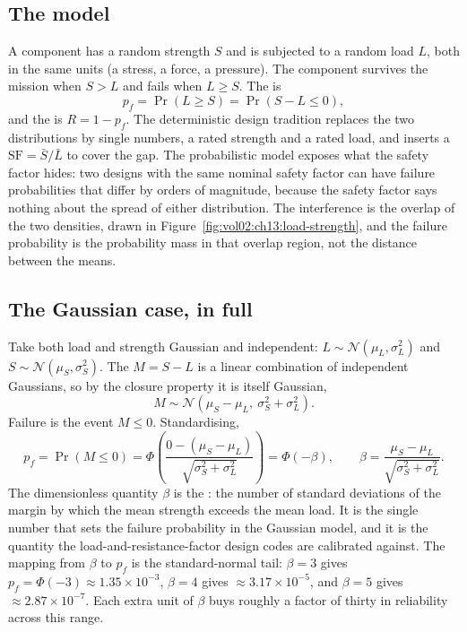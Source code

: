 \subsection{The model}

A component has a random strength $S$ and is subjected to a random
load $L$, both in the same units (a stress, a force, a pressure). The
component survives the mission when $S > L$ and fails when $L \geq S$.
The  is
\[
p_{f} = \Pr(L \geq S) = \Pr(S - L \leq 0),
\]
and the  is $R = 1 - p_{f}$. The deterministic
design tradition replaces the two distributions by single numbers, a
rated strength and a rated load, and inserts a 
$\mathrm{SF} = \bar S / \bar L$ to cover the gap. The probabilistic
model exposes what the safety factor hides: two designs with the same
nominal safety factor can have failure probabilities that differ by
orders of magnitude, because the safety factor says nothing about the
spread of either distribution. The interference is the overlap of the
two densities, drawn in
Figure~\ref{fig:vol02:ch13:load-strength}, and the failure probability
is the probability mass in that overlap region, not the distance
between the means.



\subsection{The Gaussian case, in full}

Take both load and strength Gaussian and independent:
$L \sim \mathcal{N}(\mu_{L}, \sigma_{L}^{2})$ and $S \sim
\mathcal{N}(\mu_{S}, \sigma_{S}^{2})$. The 
$M = S - L$ is a linear combination of independent Gaussians, so by
the closure property it is itself Gaussian,
\[
M \sim \mathcal{N}\!\left( \mu_{S} - \mu_{L},\
\sigma_{S}^{2} + \sigma_{L}^{2} \right).
\]
Failure is the event $M \leq 0$. Standardising,
\[
p_{f} = \Pr(M \leq 0) = \Phi\!\left(
\frac{0 - (\mu_{S} - \mu_{L})}
{\sqrt{\sigma_{S}^{2} + \sigma_{L}^{2}}} \right)
= \Phi(-\beta), \qquad
\beta = \frac{\mu_{S} - \mu_{L}}
{\sqrt{\sigma_{S}^{2} + \sigma_{L}^{2}}}.
\]
The dimensionless quantity $\beta$ is the :
the number of standard deviations of the margin by which the mean
strength exceeds the mean load. It is the single number that sets the
failure probability in the Gaussian model, and it is the quantity the
load-and-resistance-factor design codes are calibrated against. The
mapping from $\beta$ to $p_{f}$ is the standard-normal tail: $\beta =
3$ gives $p_{f} = \Phi(-3) \approx 1.35 \times 10^{-3}$, $\beta = 4$
gives $\approx 3.17 \times 10^{-5}$, and $\beta = 5$ gives $\approx
2.87 \times 10^{-7}$. Each extra unit of $\beta$ buys roughly a factor
of thirty in reliability across this range.

